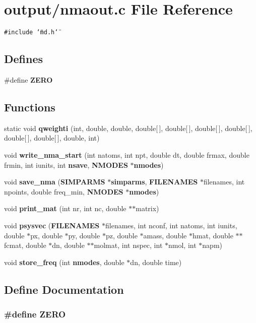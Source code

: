 \section{output/nmaout.c File Reference}
\label{nmaout_8c}
{\tt \#include \char`\"{}md.h\char`\"{}}\par
\subsection*{Defines}
\begin{CompactItemize}
\item 
\#define {\bf ZERO}
\end{CompactItemize}
\subsection*{Functions}
\begin{CompactItemize}
\item 
static void {\bf qweighti} (int, double, double, double[$\,$], double[$\,$], double[$\,$], double[$\,$], double[$\,$], double[$\,$], double, int)
\item 
void {\bf write\_\-nma\_\-start} (int natoms, int npt, double dt, double frmax, double frmin, int iunits, int {\bf nsave}, {\bf NMODES} $\ast${\bf nmodes})
\item 
void {\bf save\_\-nma} ({\bf SIMPARMS} $\ast${\bf simparms}, {\bf FILENAMES} $\ast$filenames, int npoints, double freq\_\-min, {\bf NMODES} $\ast${\bf nmodes})
\item 
void {\bf print\_\-mat} (int nr, int nc, double $\ast$$\ast$matrix)
\item 
void {\bf psysvec} ({\bf FILENAMES} $\ast$filenames, int nconf, int natoms, int iunits, double $\ast$px, double $\ast$py, double $\ast$pz, double $\ast$amass, double $\ast$hmat, double $\ast$$\ast$fcmat, double $\ast$dn, double $\ast$$\ast$molmat, int nspec, int $\ast$nmol, int $\ast$napm)
\item 
void {\bf store\_\-freq} (int {\bf nmodes}, double $\ast$dn, double time)
\end{CompactItemize}


\subsection{Define Documentation}
\subsubsection{\setlength{\rightskip}{0pt plus 5cm}\#define ZERO}\label{nmaout_8c_c328e551bde3d39b6d7b8cc9e048d941}




